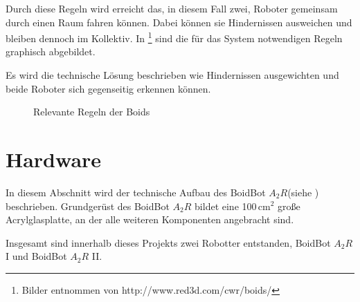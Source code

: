 \documentclass[12pt,a4paper,titlepage]{article}
\newcommand{\boidbot}[0]{BoidBot $A_{2}R$\xspace}
\begin{document}
Durch diese Regeln wird erreicht das, in diesem Fall zwei, Roboter gemeinsam durch einen Raum fahren können. Dabei können sie Hindernissen ausweichen und bleiben dennoch im Kollektiv. In \footnote{Bilder entnommen von http://www.red3d.com/cwr/boids/} sind die für das System notwendigen Regeln graphisch abgebildet.

Es wird die technische Lösung beschrieben wie Hindernissen ausgewichten und beide Roboter sich gegenseitig erkennen können.

\clearpage\begin{figure}
    \begin{center}
        \caption[Relevante Regeln der Boids]{Relevante Regeln der Boids}
        \label{fig:boid-rules}
    \end{center}
\end{figure}

\section{Hardware}

In diesem Abschnitt wird der technische Aufbau des \boidbot (siehe ) beschrieben. Grundgerüst des \boidbot bildet eine 100\,cm$^2$ große Acrylglasplatte, an der alle weiteren Komponenten angebracht sind.

Insgesamt sind innerhalb dieses Projekts zwei Robotter entstanden, \boidbot I und \boidbot II.
\end{document}

